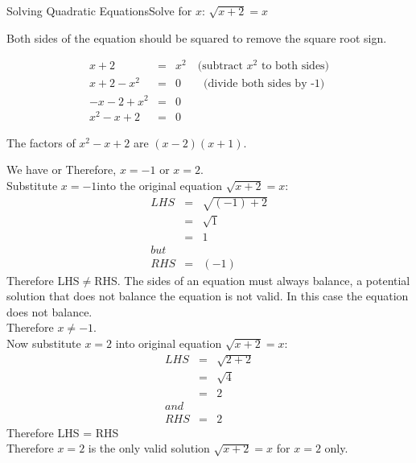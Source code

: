 \documentclass[10pt,a4paper,titlepage,twoside,openright]{report}
\begin{document}
\begin{wex}{Solving Quadratic Equations}{Solve for $x$: $\sqrt{x+2}=x$}{
Both sides of the equation should be squared to remove the square root sign.

\begin{eqnarray*}
x+2&=&x^2 \quad\mbox{(subtract $x^2$ to both sides)}\\
x+2-x^2&=&0 \quad\quad\mbox{(divide both sides by -1)}\\
-x-2+x^2&=&0\\
x^2-x+2&=&0
\end{eqnarray*}


The factors of $x^2-x+2$ are $(x-2)(x+1)$.\\


We have 
or
Therefore, $x=-1$ or $x=2$.\\

Substitute $x=-1$into the original equation $\sqrt{x+2}=x$:\\
\begin{eqnarray*}
LHS&=&\sqrt{(-1)+2}\\
&=&\sqrt{1}\\
&=&1\\
but\\
RHS&=&(-1)
\end{eqnarray*}
Therefore LHS$\neq${RHS}. The sides of an equation must always balance, a potential solution that does not balance the equation is not valid. In this case the equation does not balance.\\
Therefore $x\neq -1$.\\
Now substitute $x=2$ into original equation $\sqrt{x+2}=x$:\\
\begin{eqnarray*}
LHS&=&\sqrt{2+2}\\
&=&\sqrt{4}\\
&=&2\\
and\\
RHS &=& 2
\end{eqnarray*}
Therefore LHS = RHS\\
Therefore $x=2$ is the only valid solution
$\sqrt{x+2}=x$ for  $x=2$ only.}
\end{wex}
\end{document}
